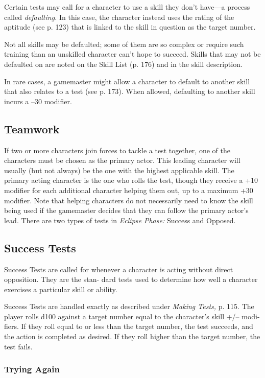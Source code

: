 Certain tests may call for a character to use a skill they 
don't have—a process called \textit{defaulting.} In this case, 
the character instead uses the rating of the aptitude 
(see p. 123) that is linked to the skill in question as the 
target number.

Not all skills may be defaulted; some of them are 
so complex or require such training than an unskilled 
character can't hope to succeed. Skills that may not be 
defaulted on are noted on the Skill List (p. 176) and in 
the skill description.

In rare cases, a gamemaster might allow a character 
to default to another skill that also relates to a test 
(see p. 173). When allowed, defaulting to another skill 
incurs a –30 modifier.

\subsection{Teamwork}

If two or more characters join forces to tackle a test 
together, one of the characters must be chosen as the 
primary actor. This leading character will usually (but 
not always) be the one with the highest applicable 
skill. The primary acting character is the one who 
rolls the test, though they receive a +10 modifier for 
each additional character helping them out, up to a 
maximum +30 modifier. Note that helping characters 
do not necessarily need to know the skill being used 
if the gamemaster decides that they can follow the 
primary actor's lead.
There are two types of tests in \textit{Eclipse Phase:} Success 
and Opposed.

\subsection{Success Tests}

Success Tests are called for whenever a character is 
acting without direct opposition. They are the stan-
dard tests used to determine how well a character 
exercises a particular skill or ability.

Success Tests are handled exactly as described under 
\textit{Making Tests,} p. 115. The player rolls d100 against a 
target number equal to the character's skill +/– modi-
fiers. If they roll equal to or less than the target number, 
the test succeeds, and the action is completed as desired. 
If they roll higher than the target number, the test fails.

\subsubsection{Trying Again}

